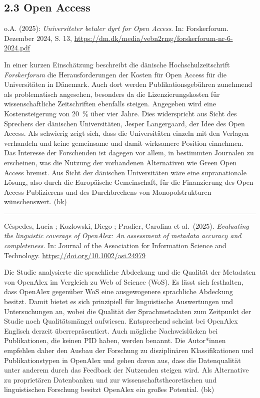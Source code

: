 \documentclass[a4paper,
fontsize=11pt,
oneside,
numbers=noperiodatend,
parskip=half-,
bibliography=totoc,
final
]{scrartcl}
\begin{document}
\subsection{2.3 Open Access}\label{open-access}

o.A. (2025): \emph{Universiteter betaler dyrt for Open Access}. In:
Forskerforum. Dezember 2024, S. 13,
\url{https://dm.dk/media/vebn2rmg/forskerforum-nr-6-2024.pdf}

In einer kurzen Einschätzung beschreibt die dänische
Hochschulzeitschrift \emph{Forskerforum} die Herausforderungen der
Kosten für Open Access für die Universitäten in Dänemark. Auch dort
werden Publikationsgebühren zunehmend als problematisch angesehen,
besonders da die Lizenzierungskosten für wissenschaftliche Zeitschriften
ebenfalls steigen. Angegeben wird eine Kostensteigerung von 20~\% über
vier Jahre. Dies widerspricht aus Sicht des Sprechers der dänischen
Universitäten, Jesper Langergaard, der Idee des Open Access. Als
schwierig zeigt sich, dass die Universitäten einzeln mit den Verlagen
verhandeln und keine gemeinsame und damit wirksamere Position einnehmen.
Das Interesse der Forschenden ist dagegen vor allem, in bestimmten
Journalen zu erscheinen, was die Nutzung der vorhandenen Alternativen
wie Green Open Access bremst. Aus Sicht der dänischen Universitäten wäre
eine supranationale Lösung, also durch die Europäische Gemeinschaft, für
die Finanzierung des Open-Access-Publizierens und des Durchbrechens von
Monopolstrukturen wünschenswert. (bk)

\begin{center}\rule{0.5\linewidth}{0.5pt}\end{center}

Céspedes, Lucía ; Kozlowski, Diego ; Pradier, Carolina et al.~(2025).
\emph{Evaluating the linguistic coverage of OpenAlex: An assessment of
metadata accuracy and completeness.} In: Journal of the Association for
Information Science and Technology.
\url{https://doi.org/10.1002/asi.24979}

Die Studie analysierte die sprachliche Abdeckung und die Qualität der
Metadaten von OpenAlex im Vergleich zu Web of Science (WoS). Es lässt
sich festhalten, dass OpenAlex gegenüber WoS eine ausgewogenere
sprachliche Abdeckung besitzt. Damit bietet es sich prinzipiell für
linguistische Auswertungen und Untersuchungen an, wobei die Qualität der
Sprachmetadaten zum Zeitpunkt der Studie noch Qualitätsmängel aufwiesen.
Entsprechend scheint bei OpenAlex Englisch derzeit überrepräsentiert.
Auch mögliche Nachweislücken bei Publikationen, die keinen PID haben,
werden benannt. Die Autor*innen empfehlen daher den Ausbau der Forschung
zu disziplinären Klassifikationen und Publikationstypen in OpenAlex und
gehen davon aus, dass die Datenqualität unter anderem durch das Feedback
der Nutzenden steigen wird. Als Alternative zu proprietären Datenbanken
und zur wissenschaftstheoretischen und linguistischen Forschung besitzt
OpenAlex ein großes Potential. (bk)
\end{document}
